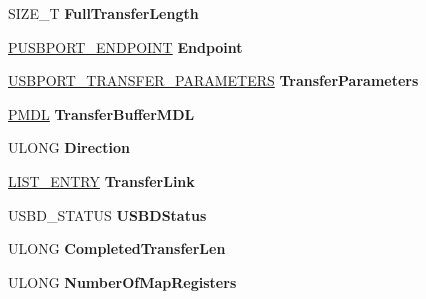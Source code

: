 \begin{DoxyCompactItemize}
S\+I\+Z\+E\+\_\+T {\bfseries Full\+Transfer\+Length}
\item 
\mbox{\label{struct___u_s_b_p_o_r_t___t_r_a_n_s_f_e_r_ab367f4b021ba3ca245e9cdf2c5d88664}} 
\hyperlink{struct___u_s_b_p_o_r_t___e_n_d_p_o_i_n_t}{P\+U\+S\+B\+P\+O\+R\+T\+\_\+\+E\+N\+D\+P\+O\+I\+NT} {\bfseries Endpoint}
\item 
\mbox{\label{struct___u_s_b_p_o_r_t___t_r_a_n_s_f_e_r_aa272a5e7f3b9c113aa898d7f49943e03}} 
\hyperlink{struct___u_s_b_p_o_r_t___t_r_a_n_s_f_e_r___p_a_r_a_m_e_t_e_r_s}{U\+S\+B\+P\+O\+R\+T\+\_\+\+T\+R\+A\+N\+S\+F\+E\+R\+\_\+\+P\+A\+R\+A\+M\+E\+T\+E\+RS} {\bfseries Transfer\+Parameters}
\item 
\mbox{\label{struct___u_s_b_p_o_r_t___t_r_a_n_s_f_e_r_a21bd63d54c77c9e9115a76b83c972f2f}} 
\hyperlink{interfacevoid}{P\+M\+DL} {\bfseries Transfer\+Buffer\+M\+DL}
\item 
\mbox{\label{struct___u_s_b_p_o_r_t___t_r_a_n_s_f_e_r_ade40a01a3e92024d36668fdd6868db19}} 
U\+L\+O\+NG {\bfseries Direction}
\item 
\mbox{\label{struct___u_s_b_p_o_r_t___t_r_a_n_s_f_e_r_ae8cf726846a8d9fbe5815579e3540f30}} 
\hyperlink{struct___l_i_s_t___e_n_t_r_y}{L\+I\+S\+T\+\_\+\+E\+N\+T\+RY} {\bfseries Transfer\+Link}
\item 
\mbox{\label{struct___u_s_b_p_o_r_t___t_r_a_n_s_f_e_r_a46c59687cabb772b843415752a3e03be}} 
U\+S\+B\+D\+\_\+\+S\+T\+A\+T\+US {\bfseries U\+S\+B\+D\+Status}
\item 
\mbox{\label{struct___u_s_b_p_o_r_t___t_r_a_n_s_f_e_r_a2085032930817486bd07f8f7549203d0}} 
U\+L\+O\+NG {\bfseries Completed\+Transfer\+Len}
\item 
\mbox{\label{struct___u_s_b_p_o_r_t___t_r_a_n_s_f_e_r_a2eb712e42567888c190575eb594b6fb0}} 
U\+L\+O\+NG {\bfseries Number\+Of\+Map\+Registers}
\item 
\mbox{\label{struct___u_s_b_p_o_r_t___t_r_a_n_s_f_e_r_aa0295174b391d8c7256b48f149c24875}} 

\end{DoxyCompactItemize}
